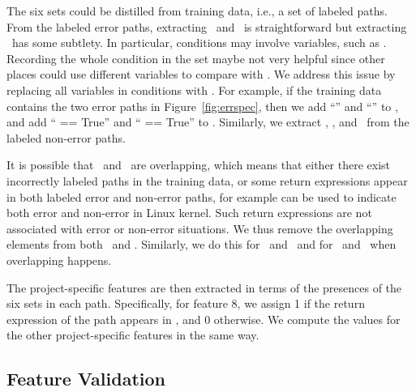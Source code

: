 \documentclass[12pt]{report}	%
\begin{document}
The six sets could be distilled from training data, i.e., a set of labeled paths.
%
From the labeled error paths,
extracting \errsetRetVar\ and \errsetLastFunc\ is straightforward but extracting
\errsetLastCond\ has some subtlety. In particular, conditions may involve
variables, such as . Recording the whole 
condition in the set maybe not very helpful since other places could
use different variables to compare with . We address
this issue by replacing all variables in conditions with . 
%
For example, if the training data contains the two error paths in Figure~\ref{fig:errspec},
then we add ``'' and ``'' to \errsetRetVar,
and add `` == True'' 
and `` == True'' to \errsetLastCond.
%
Similarly, we extract \nerrsetRetVar, \nerrsetLastCond, and \nerrsetLastFunc\ from the labeled non-error paths. 

It is possible that \errsetRetVar\ and \nerrsetRetVar\ are overlapping, 
which means that either there exist incorrectly labeled paths in the training data,
or some return expressions appear in both labeled error and
non-error paths, for example  can be used to indicate both error and non-error in Linux kernel.
%
Such return expressions are not associated with error or non-error situations. 
We thus remove the overlapping elements from both \errsetRetVar\ and \nerrsetRetVar. 
Similarly, we do this for \errsetLastCond\ and \nerrsetLastCond\ and for \errsetLastFunc\ and \nerrsetLastFunc\ when overlapping happens.

The project-specific features are then extracted in terms of the presences of the six sets in each path.
%
Specifically, for feature 8, we assign 1 if the return expression of the path appears in \errsetRetVar,
and 0 otherwise. We compute the values for the other project-specific features in the same way.

\subsection{Feature Validation}
\label{sec:app:features:valid}
\end{document}
